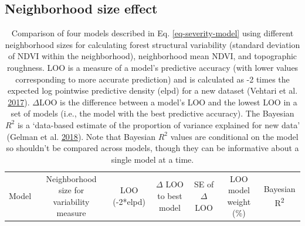 \documentclass[twoside,12pt,final]{ucthesis-CA2012}
\begin{document}
\begin{ucmainmatter}
\subsection{Neighborhood size effect}\label{neighborhood-size-effect}
\begin{longtable}[]{@{}ccccccc@{}}
\caption{Comparison of four models described in Eq.
\ref{eq-severity-model} using different neighborhood sizes for
calculating forest structural variability (standard deviation of NDVI
within the neighborhood), neighborhood mean NDVI, and topographic
roughness. LOO is a measure of a model's predictive accuracy (with lower
values corresponding to more accurate prediction) and is calculated as
-2 times the expected log pointwise predictive density (elpd) for a new
dataset (Vehtari et al. \protect\hyperlink{ref-vehtari2017}{2017}).
\(\Delta\)LOO is the difference between a model's LOO and the lowest LOO
in a set of models (i.e., the model with the best predictive accuracy).
The Bayesian \(R^2\) is a `data-based estimate of the proportion of
variance explained for new data' (Gelman et al.
\protect\hyperlink{ref-gelman2018}{2018}). Note that Bayesian \(R^2\)
values are conditional on the model so shouldn't be compared across
models, though they can be informative about a single model at a
time.}\tabularnewline
\toprule
\begin{minipage}[b]{0.06\columnwidth}\centering\strut
Model\strut
\end{minipage} & \begin{minipage}[b]{0.17\columnwidth}\centering\strut
Neighborhood size for variability measure\strut
\end{minipage} & \begin{minipage}[b]{0.09\columnwidth}\centering\strut
LOO (-2*elpd)\strut
\end{minipage} & \begin{minipage}[b]{0.11\columnwidth}\centering\strut
\(\Delta\) LOO to best model\strut
\end{minipage} & \begin{minipage}[b]{0.11\columnwidth}\centering\strut
SE of \(\Delta\) LOO\strut
\end{minipage} & \begin{minipage}[b]{0.16\columnwidth}\centering\strut
LOO model weight (\%)\strut
\end{minipage} & \begin{minipage}[b]{0.11\columnwidth}\centering\strut
Bayesian R\textsuperscript{2}\strut
\end{minipage}\tabularnewline

\end{longtable}
\end{ucmainmatter}
\end{document}
